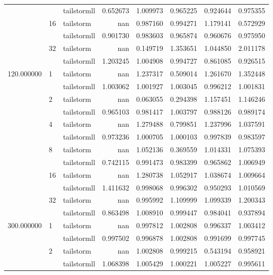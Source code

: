 \begin{tabular}{lllrrrrr}
 &  & tailstormll & 0.652673 & 1.009973 & 0.965225 & 0.924644 & 0.975355 \\
 & \multirow[c]{2}{*}{16} & tailstorm & nan & 0.987160 & 0.994271 & 1.179141 & 0.572929 \\
 &  & tailstormll & 0.901730 & 0.983603 & 0.965874 & 0.960676 & 0.975950 \\
 & \multirow[c]{2}{*}{32} & tailstorm & nan & 0.149719 & 1.353651 & 1.044850 & 2.011178 \\
 &  & tailstormll & 1.203245 & 1.004908 & 0.994727 & 0.861085 & 0.926515 \\
\multirow[c]{12}{*}{120.000000} & \multirow[c]{2}{*}{1} & tailstorm & nan & 1.237317 & 0.509014 & 1.261670 & 1.352448 \\
 &  & tailstormll & 1.003062 & 1.001927 & 1.003045 & 0.996212 & 1.001831 \\
 & \multirow[c]{2}{*}{2} & tailstorm & nan & 0.063055 & 0.294398 & 1.157451 & 1.146246 \\
 &  & tailstormll & 0.965103 & 0.981417 & 1.003797 & 0.988126 & 0.989174 \\
 & \multirow[c]{2}{*}{4} & tailstorm & nan & 1.279488 & 0.799851 & 1.237996 & 1.037591 \\
 &  & tailstormll & 0.973236 & 1.000705 & 1.000103 & 0.997839 & 0.983597 \\
 & \multirow[c]{2}{*}{8} & tailstorm & nan & 1.052136 & 0.369559 & 1.014331 & 1.075393 \\
 &  & tailstormll & 0.742115 & 0.991473 & 0.983399 & 0.965862 & 1.006949 \\
 & \multirow[c]{2}{*}{16} & tailstorm & nan & 1.280738 & 1.052917 & 1.038674 & 1.009664 \\
 &  & tailstormll & 1.411632 & 0.998068 & 0.996302 & 0.950293 & 1.010569 \\
 & \multirow[c]{2}{*}{32} & tailstorm & nan & 0.995992 & 1.109999 & 1.099339 & 1.200343 \\
 &  & tailstormll & 0.863498 & 1.008910 & 0.999447 & 0.984041 & 0.937894 \\
\multirow[c]{12}{*}{300.000000} & \multirow[c]{2}{*}{1} & tailstorm & nan & 0.997812 & 1.002808 & 0.996337 & 1.003412 \\
 &  & tailstormll & 0.997502 & 0.996878 & 1.002808 & 0.991699 & 0.997745 \\
 & \multirow[c]{2}{*}{2} & tailstorm & nan & 1.002808 & 0.999215 & 0.543194 & 0.958921 \\
 &  & tailstormll & 1.068398 & 1.005429 & 1.000221 & 1.005227 & 0.995611 \\

\end{tabular}

